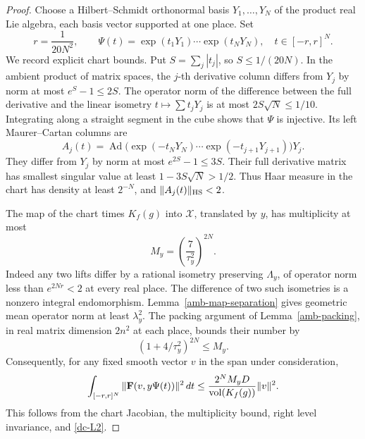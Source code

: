 \begin{proof}
Choose a Hilbert--Schmidt orthonormal basis
\(Y_1,\ldots,Y_N\) of the product real Lie algebra,
each basis vector supported at one place.  Set
\[
 r=\frac1{20N^2},\qquad
 \Psi(t)=\exp(t_1Y_1)\cdots\exp(t_NY_N),
                         \quad t\in[-r,r]^N.
\]
We record explicit chart bounds.  Put \(S=\sum_j|t_j|\),
so \(S\le1/(20N)\).  In the ambient product of
matrix spaces, the \(j\)-th derivative column differs
from \(Y_j\) by norm at most \(e^S-1\le2S\).
The operator norm of the difference between the full
derivative and the linear isometry
\(t\mapsto\sum t_jY_j\) is at most
\(2S\sqrt N\le1/10\).
Integrating along a straight segment in the cube
shows that \(\Psi\) is injective.
Its left Maurer--Cartan columns are
\[
 A_j(t)=\operatorname{Ad}
       \bigl(\exp(-t_NY_N)\cdots\exp(-t_{j+1}Y_{j+1})\bigr)Y_j.
\]
They differ from \(Y_j\) by norm at most
\(e^{2S}-1\le3S\).  Their full derivative matrix
has smallest singular value at least
\(1-3S\sqrt N>1/2\).
Thus Haar measure in the chart has density at least
\(2^{-N}\), and \(\|A_j(t)\|_{\rm HS}<2\).

The map of the chart times \(K_f(g)\) into
\(\mathcal X\), translated by \(y\), has multiplicity
at most
\[
                    M_y=\left(\frac7{\tau_y^2}\right)^{2N}.
\]
Indeed any two lifts differ by a rational isometry
preserving \(\Lambda_y\), of operator norm less than
\(e^{2Nr}<2\) at every real place.
The difference of two such isometries is a nonzero
integral endomorphism.  Lemma~\ref{amb-map-separation}
gives geometric mean operator norm at least
\(\lambda_y^2\).  The packing argument of
Lemma~\ref{amb-packing}, in real matrix dimension
\(2n^2\) at each place, bounds their number by
\[
                  (1+4/\tau_y^2)^{2N}\le M_y.
\]
Consequently, for any fixed smooth vector \(v\)
in the span under consideration,
\begin{equation}\label{dc-chart-integral}
 \int_{[-r,r]^N}\|{\bf F}(v,y\Psi(t))\|^2\,dt
       \le\frac{2^N M_yD}{\operatorname{vol}(K_f(g))}\|v\|^2.
\end{equation}
This follows from the chart Jacobian, the multiplicity
bound, right level invariance, and \eqref{dc-L2}.


\end{proof}
